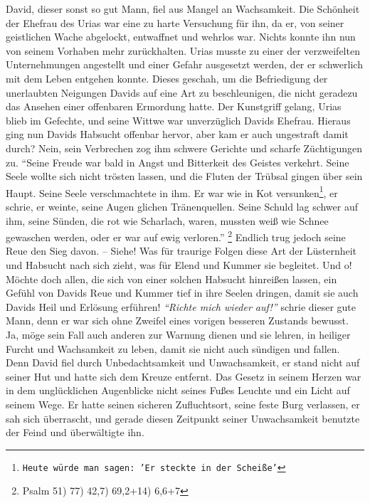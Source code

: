 David, dieser sonst so gut Mann, fiel aus Mangel an
Wachsamkeit. Die Schönheit
der Ehefrau des Urias war eine zu harte
Versuchung für ihn, da er, von seiner
geistlichen Wache abgelockt, entwaffnet und wehrlos war. Nichts konnte ihn nun
von seinem Vorhaben mehr zurückhalten. Urias musste zu
einer der verzweifelten
Unternehmungen angestellt und einer Gefahr ausgesetzt werden, der er schwerlich
mit dem Leben entgehen konnte. Dieses geschah, um die Befriedigung der
unerlaubten Neigungen Davids auf eine Art zu beschleunigen, die nicht geradezu
das Ansehen einer offenbaren Ermordung hatte. Der Kunstgriff gelang, Urias blieb
im Gefechte, und seine Wittwe war unverzüglich Davids Ehefrau. Hieraus ging nun
Davids Habsucht offenbar hervor, aber kam er auch ungestraft
damit durch? Nein,
sein Verbrechen zog ihm schwere Gerichte und scharfe Züchtigungen zu.
"`Seine
Freude war bald in Angst und Bitterkeit des Geistes verkehrt. Seine Seele
wollte sich nicht trösten lassen, und die Fluten der Trübsal gingen über sein
Haupt. Seine Seele verschmachtete in ihm. Er war wie in Kot
versunken\footnote{\texttt{Heute würde man sagen: 'Er steckte in der Scheiße'}},
er schrie, er weinte,
seine Augen glichen Tränenquellen. Seine Schuld lag schwer auf ihm, seine
Sünden, die rot wie Scharlach, waren, mussten weiß wie Schnee gewaschen
werden, oder er war auf ewig verloren."'
\footnote{Psalm 51) 77) 42,7) 69,2+14) 6,6+7}
Endlich trug jedoch seine Reue den Sieg davon. -- Siehe! Was für
traurige Folgen diese Art der Lüsternheit und Habsucht nach
sich zieht, was für
Elend und Kummer sie begleitet. Und o! Möchte doch allen, die sich von einer
solchen Habsucht hinreißen lassen, ein Gefühl von Davids Reue und Kummer tief in
ihre Seelen dringen, damit sie auch Davids Heil und Erlösung erführen!
\textit{"`Richte
mich wieder auf!"'} schrie dieser gute Mann, denn er war sich ohne Zweifel eines
vorigen besseren Zustands bewusst. Ja, möge sein Fall auch anderen zur Warnung
dienen und sie lehren, in heiliger Furcht und Wachsamkeit
zu leben, damit sie
nicht auch sündigen und fallen. Denn David fiel durch Unbedachtsamkeit und
Unwachsamkeit, er stand nicht auf seiner Hut und hatte sich dem Kreuze
entfernt. Das Gesetz in seinem Herzen war in dem
unglücklichen Augenblicke nicht
seines Fußes Leuchte und ein Licht auf seinem Wege. Er hatte seinen sicheren
Zufluchtsort, seine feste Burg verlassen, er sah sich überrascht, und gerade
diesen Zeitpunkt seiner Unwachsamkeit benutzte der Feind und überwältigte ihn.

